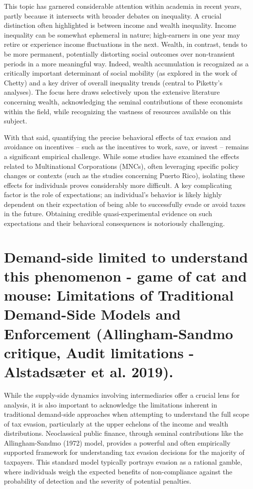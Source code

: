 This topic has garnered considerable attention within academia in recent years, partly because it intersects with broader debates on inequality. A crucial distinction often highlighted is between income and wealth inequality. Income inequality can be somewhat ephemeral in nature; high-earners in one year may retire or experience income fluctuations in the next. Wealth, in contrast, tends to be more permanent, potentially distorting social outcomes over non-transient periods in a more meaningful way. Indeed, wealth accumulation is recognized as a critically important determinant of social mobility (as explored in the work of Chetty) and a key driver of overall inequality trends (central to Piketty's analyses). The focus here draws selectively upon the extensive literature concerning wealth, acknowledging the seminal contributions of these economists within the field, while recognizing the vastness of resources available on this subject.

With that said, quantifying the precise behavioral effects of tax evasion and avoidance on incentives – such as the incentives to work, save, or invest – remains a significant empirical challenge. While some studies have examined the effects related to Multinational Corporations (MNCs), often leveraging specific policy changes or contexts (such as the studies concerning Puerto Rico), isolating these effects for individuals proves considerably more difficult. A key complicating factor is the role of expectations; an individual's behavior is likely highly dependent on their expectation of being able to successfully evade or avoid taxes in the future. Obtaining credible quasi-experimental evidence on such expectations and their behavioral consequences is notoriously challenging.

\section{Demand-side limited to understand this phenomenon - game of cat and mouse: Limitations of Traditional Demand-Side Models and Enforcement (Allingham-Sandmo critique, Audit limitations - Alstadsæter et al. 2019).}
\label{sec:1_2}

While the supply-side dynamics involving intermediaries offer a crucial lens for analysis, it is also important to acknowledge the limitations inherent in traditional demand-side approaches when attempting to understand the full scope of tax evasion, particularly at the upper echelons of the income and wealth distributions. Neoclassical public finance, through seminal contributions like the Allingham-Sandmo (1972) model, provides a powerful and often empirically supported framework for understanding tax evasion decisions for the majority of taxpayers. This standard model typically portrays evasion as a rational gamble, where individuals weigh the expected benefits of non-compliance against the probability of detection and the severity of potential penalties.

